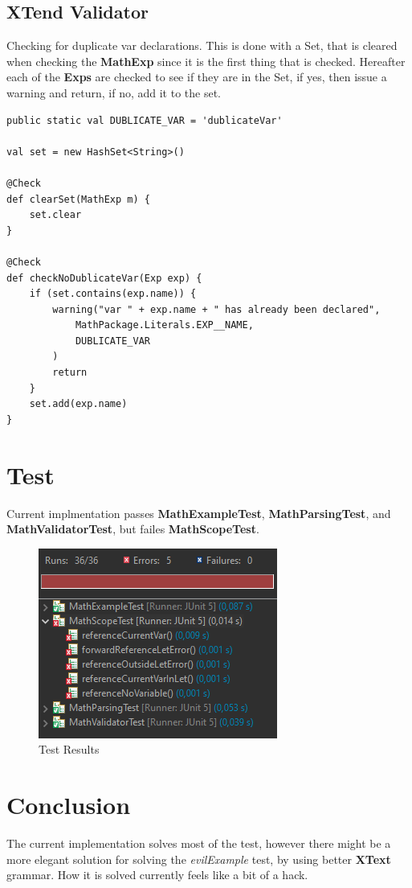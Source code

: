 \documentclass{article}
\begin{document}
\subsection{XTend Validator}

Checking for duplicate var declarations. This is done with a Set, that is cleared when checking the \textbf{MathExp} since it is the first thing that is checked. Hereafter each of the \textbf{Exps} are checked to see if they are in the Set, if yes, then issue a warning and return, if no, add it to the set.

\begin{lstlisting}[language={xtend}, caption={XTend validator}, captionpos={b}]
public static val DUBLICATE_VAR = 'dublicateVar'

val set = new HashSet<String>()

@Check
def clearSet(MathExp m) {
    set.clear
}

@Check
def checkNoDublicateVar(Exp exp) {
    if (set.contains(exp.name)) {
        warning("var " + exp.name + " has already been declared",
            MathPackage.Literals.EXP__NAME,
            DUBLICATE_VAR
        )
        return
    }
    set.add(exp.name)
}
\end{lstlisting}
\section{Test}

Current implmentation passes \textbf{MathExampleTest}, \textbf{MathParsingTest}, and \textbf{MathValidatorTest}, but failes \textbf{MathScopeTest}.

\begin{figure}[H]
    \centering
    \includegraphics{tests.PNG}
    \caption{Test Results}
\end{figure}

\section{Conclusion}

The current implementation solves most of the test, however there might be a more elegant solution for solving the \textit{evilExample} test, by using better \textbf{XText} grammar. How it is solved currently feels like a bit of a hack.
\end{document}
